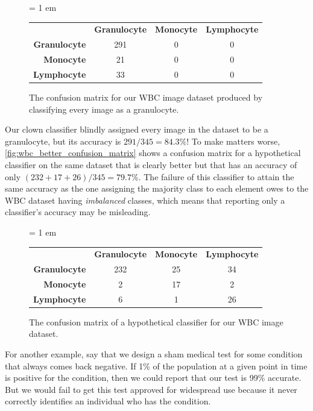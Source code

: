 \begin{figure}[h]
\centering
\tabcolsep = 1 em
\mySfFamily
{}
\begin{tabular}{r c c c}
\rowcolor{gray!50}
& \textbf{Granulocyte} & \textbf{Monocyte} & \textbf{Lymphocyte} \\
\textbf{Granulocyte} & 291 & 0 & 0 \\
\textbf{Monocyte} & \phantom{5}21 & 0 & 0 \\
\textbf{Lymphocyte} & \phantom{5}33 & 0 & 0
\end{tabular}
\caption{The confusion matrix for our WBC image dataset produced by classifying every image as a granulocyte.}
\label{fig:wbc_clown_matrix}
\end{figure}

\begin{qbox}\end{qbox}

Our clown classifier blindly assigned every image in the dataset to be a granulocyte, but its accuracy is $291/345 = 84.3\%$! To make matters worse, \autoref{fig:wbc_better_confusion_matrix} shows a confusion matrix for a hypothetical classifier on the same dataset that is clearly better but that has an accuracy of only $(232 + 17 + 26)/345 = 79.7\%$. The failure of this classifier to attain the same accuracy as the one assigning the majority class to each element owes to the WBC dataset having \textit{imbalanced} classes, which means that reporting only a classifier's accuracy may be misleading.\\

\begin{figure}[h]
\centering
\tabcolsep = 1 em
\mySfFamily
{}
\begin{tabular}{r c c c}
\rowcolor{gray!50}
& \textbf{Granulocyte} & \textbf{Monocyte} & \textbf{Lymphocyte} \\
 \textbf{Granulocyte} & 232 & 25 & 34 \\
\textbf{Monocyte} & \phantom{55}2 & 17 & \phantom{5}2 \\
\textbf{Lymphocyte} & \phantom{55}6 & \phantom{5}1 & 26
\end{tabular}
\caption{The confusion matrix of a hypothetical classifier for our WBC image dataset.}
\label{fig:wbc_better_confusion_matrix}
\end{figure}

For another example, say that we design a sham medical test for some condition that always comes back negative. If 1\% of the population at a given point in time is positive for the condition, then we could report that our test is 99\% accurate. But we would fail to get this test approved for widespread use because it never correctly identifies an individual who has the condition.\\

